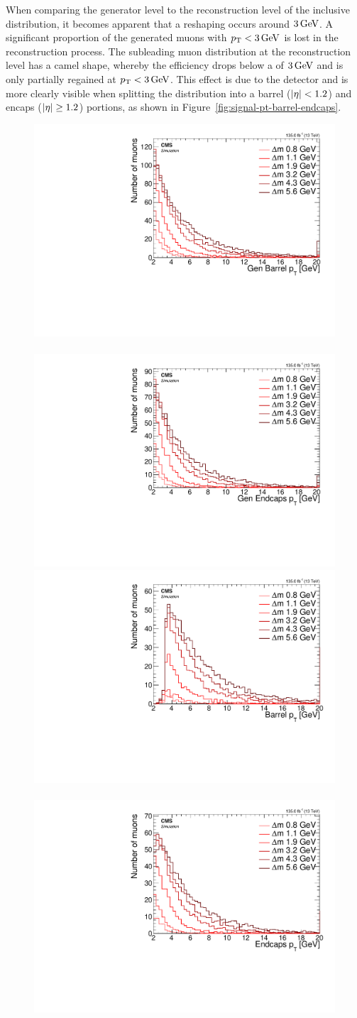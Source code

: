 When comparing the generator level to the reconstruction level of the inclusive \pt distribution, it becomes apparent that a reshaping occurs around $3 \,\text{Ge\hspace{-.08em}V}$. A significant proportion of the generated muons with $p_{\mathrm{T}}<3\,\text{Ge\hspace{-.08em}V}$ is lost in the reconstruction process. The subleading muon \pt distribution at the reconstruction level has a camel shape, whereby the efficiency drops below a \pt of $3\,\text{Ge\hspace{-.08em}V}$ and is only partially regained at $p_{\mathrm{T}}<3\,\text{Ge\hspace{-.08em}V}$. This effect is due to the detector and is more clearly visible when splitting the \pt distribution into a barrel ($\lvert \eta \rvert < 1.2$) and encaps ($\lvert \eta \rvert \geq 1.2$) portions, as shown in Figure~\ref{fig:signal-pt-barrel-endcaps}.

\begin{figure}[!htb]
\centering
\includegraphics[width=0.48\linewidth]{plots/signal_muons_gen/none_Muons_pt_barrel.pdf} \,
\includegraphics[width=0.48\linewidth]{plots/signal_muons_gen/none_Muons_pt_endcape.pdf}  \\
\includegraphics[width=0.48\linewidth]{plots/signal_muons/none_Muons_pt_barrel.pdf} \,
\includegraphics[width=0.48\linewidth]{plots/signal_muons/none_Muons_pt_endcape.pdf}  \\

\end{figure}
